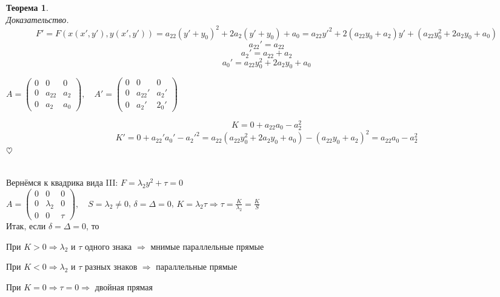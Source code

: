 \documentclass{article}
\theoremstyle{definition}
\newtheorem{theorem}{Теорема}[section]
\newenvironment{ourproof}{\textit{\\ Доказательство.\\ }}{$\hfill \heartsuit$}
\begin{document}
\begin{theorem}
\begin{ourproof}
$$F' = F(x(x',y'), y(x', y')) = a_{22} (y' + y_0)^2 + 2a_2 (y' + y_0) + a_0 = a_{22} y'^2 + 2(a_{22} y_0 + a_2)y' + (a_{22} y_0^2 + 2 a_2 y_0 + a_0) $$
$$a_{22}' = a_{22}$$ 
$$a_2' = a_{22} + a_2$$
$$a_0' = a_{22} y_0^2 + 2 a_2 y_0 + a_0 $$

$A =  \begin{pmatrix}
0 & 0 & 0 \\
0 & a_{22} & a_2 \\
0 & a_2 & a_0
\end{pmatrix} ,\quad A' =  \begin{pmatrix}
0 & 0 & 0 \\
0 & a_{22}' & a_2' \\
0 & a_2' & 2_0'
\end{pmatrix}$


$$K = 0 + a_{22} a_0 - a_2^2$$
$$K' = 0 + a_{22}' a_0' - a_2'^2 = a_{22}(a_{22}y_0^2 + 2 a_2 y_0 + a_0) - (a_{22} y_0 + a_2)^2 = a_{22} a_0 - a_2^2$$
\end{ourproof}
\end{theorem}

\\ Вернёмся к квадрика вида III: $F = \lambda_2 y^2 + \tau = 0$
\\ $A =  \begin{pmatrix}
0 & 0 & 0 \\
0 & \lambda_2 & 0 \\
0 & 0 & \tau
\end{pmatrix},\quad S = \lambda_2 \neq 0$, $\delta = \Delta = 0$, $K=\lambda_2 \tau \Rightarrow \tau = \frac{K}{\lambda_2} = \frac{K}{S}$
\\ Итак, если $\delta = \Delta = 0$, то

При $K > 0 \Rightarrow \lambda_2$ и $\tau$ одного знака $\Rightarrow$ мнимые параллельные прямые

При $K < 0 \Rightarrow \lambda_2$ и $\tau$ разных знаков $\Rightarrow$ параллельные прямые 

При $K = 0 \Rightarrow \tau = 0 \Rightarrow$ двойная прямая
\end{document}
